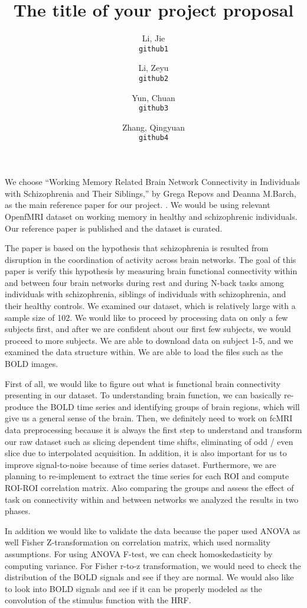 \documentclass[11pt]{article}
\title{The title of your project proposal}
\author{
  Li, Jie\\
  \texttt{github1}
  \and
  Li, Zeyu\\
  \texttt{github2}
  \and
  Yun, Chuan\\
  \texttt{github3}
  \and
  Zhang, Qingyuan\\
  \texttt{github4}
}
\begin{document}
\maketitle

We choose ``Working Memory Related Brain Network Connectivity in Individuals with Schizophrenia and Their Siblings,'' by Grega Repovs and Deanna M.Barch, as the main reference paper for our project. \cite{lindquist2008statistical}. We would be using relevant OpenfMRI dataset on working memory in healthy and schizophrenic individuals. Our reference paper is
published and the dataset is curated.

The paper is based on the hypothesis that schizophrenia is resulted from disruption in the coordination of activity across brain networks. The goal of this paper is verify this hypothesis by measuring brain functional connectivity within and between four brain networks during rest and during N-back tasks among individuals with schizophrenia, siblings of individuals with schizophrenia, and their healthy controls. We examined our dataset, which is relatively large with a sample size of 102. We would like to proceed by processing data on only a few subjects first, and after we are confident about our first few subjects, we would proceed to more subjects. We are able to download data on subject 1-5, and we examined the data structure within. We are able to load the files such as the BOLD images. 
	
First of all, we would like to figure out what is functional brain connectivity presenting in our dataset. To understanding brain function, we can basically re-produce the BOLD time series and identifying groups of brain regions, which will give us a general sense of the brain. Then, we definitely need to work on fcMRI data preprocessing because it is always the first step to understand and transform our raw dataset such as slicing dependent time shifts, eliminating of odd / even slice due to interpolated acquisition. In addition, it is also important for us to improve signal-to-noise because of time series dataset. Furthermore, we are planning to re-implement to extract the time series for each ROI and compute ROI-ROI correlation matrix. Also comparing the groups and assess the effect of task on connectivity within and between networks we analyzed the results in two phases.


In addition we would like to validate the data because the paper used ANOVA as well Fisher Z-transformation on correlation matrix, which used normality assumptions. For using ANOVA F-test, we can check homoskedasticity by computing variance. For Fisher r-to-z transformation, we would need to check the distribution of the BOLD signals and see if they are normal. We would also like to look into BOLD signals and see if it can be properly modeled as the convolution of the stimulus function with the HRF.
\end{document}
